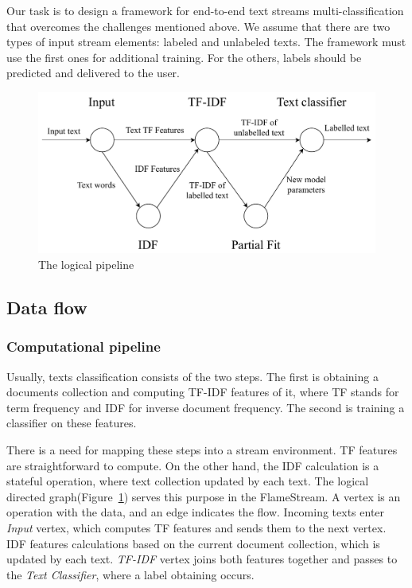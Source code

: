 \label{fs-framework}

Our task is to design a framework for end-to-end text streams multi-classification that overcomes the challenges mentioned above. We assume that there are two types of input stream elements: labeled and unlabeled texts. The framework must use the first ones for additional training. For the others, labels should be predicted and delivered to the user.

\begin{figure}[htbp]
  \centering
  \includegraphics[scale=0.48]{pics/logical-graph}
  \caption{The logical pipeline}
  \label {logical_graph}
\end{figure}

\subsection{Data flow \label{DF}}

\subsubsection{Computational pipeline}

Usually, texts classification consists of the two steps. The first is obtaining a documents collection and computing TF-IDF features of it, where TF stands for term frequency and IDF for inverse document frequency. The second is training a classifier on these features.

There is a need for mapping these steps into a stream environment. TF features are straightforward to compute. On the other hand, the IDF calculation is a stateful operation, where text collection updated by each text. The logical directed graph(Figure~\ref{logical_graph}) serves this purpose in the FlameStream. A vertex is an operation with the data, and an edge indicates the flow. Incoming texts enter {\em Input} vertex, which computes TF features and sends them to the next vertex. IDF features calculations based on the current document collection, which is updated by each text. {\em TF-IDF} vertex joins both features together and passes to the {\em Text Classifier}, where a label obtaining occurs.

